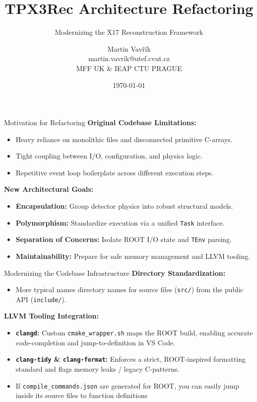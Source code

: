 \documentclass[aspectratio=169]{beamer}
\title[TPX3Rec Refactoring]{TPX3Rec Architecture Refactoring}
\subtitle{Modernizing the X17 Reconstruction Framework}
\author[M.~Vavřík]{\foreignlanguage{czech}{Martin Vavřík}\vspace{0.5cm}\\martin.vavrik@utef.cvut.cz\\MFF UK \& IEAP CTU PRAGUE\\}
\date{\today}
\begin{document}
	
	\begin{frame}
		\titlepage
	\end{frame}
	
	\begin{frame}{Motivation for Refactoring}
		\textbf{Original Codebase Limitations:}
		\begin{itemize}
			\item Heavy reliance on monolithic files and disconnected primitive C-arrays.
			\item Tight coupling between I/O, configuration, and physics logic.
			\item Repetitive event loop boilerplate across different execution steps.
		\end{itemize}
		\vspace{0.5cm}
		\textbf{New Architectural Goals:}
		\begin{itemize}
			\item \textbf{Encapsulation:} Group detector physics into robust structural models.
			\item \textbf{Polymorphism:} Standardize execution via a unified \texttt{Task} interface.
			\item \textbf{Separation of Concerns:} Isolate ROOT I/O state and \texttt{TEnv} parsing.
			\item \textbf{Maintainability:} Prepare for safe memory management and LLVM tooling.
		\end{itemize}
	\end{frame}
	
	\begin{frame}{Modernizing the Codebase Infrastructure}
		\textbf{Directory Standardization:}
		\begin{itemize}
			\item More typical names directory names for source files (\texttt{src/}) from the public API (\texttt{include/}).
		\end{itemize}
		
		\vspace{0.4cm}
		\textbf{LLVM Tooling Integration:}
		\begin{itemize}
			\item \textbf{\texttt{clangd}:} Custom \texttt{cmake\_wrapper.sh} maps the ROOT build, enabling accurate code-completion and jump-to-definition in VS Code.
			\item \textbf{\texttt{clang-tidy} \& \texttt{clang-format}:} Enforces a strict, ROOT-inspired formatting standard and flags memory leaks / legacy C-patterns.
			\item If \texttt{compile\_commands.json} are generated for ROOT, you can easily jump inside its source files to function definitions
		\end{itemize}
	\end{frame}
	
\end{document}
